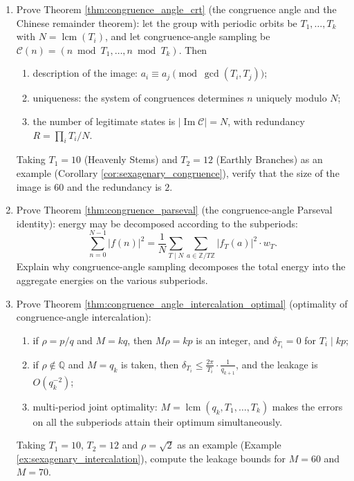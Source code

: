 \begin{enumerate}[leftmargin=3em, label=\textbf{Exercise \arabic*}]
    \item Prove Theorem \ref{thm:congruence_angle_crt} (the congruence angle and the Chinese remainder theorem):
    let the group with periodic orbits be $T_1,\dots,T_k$ with $N=\operatorname{lcm}(T_i)$, and let
    congruence-angle sampling be $\mathcal{C}(n)=(n\bmod T_1,\dots,n\bmod T_k)$. Then
    \begin{enumerate}[label=(\roman*)]
        \item description of the image: $a_i\equiv a_j\pmod{\gcd(T_i,T_j)}$;
        \item uniqueness: the system of congruences determines $n$ uniquely modulo $N$;
        \item the number of legitimate states is $|\operatorname{Im}\mathcal{C}|=N$, with redundancy
              $R=\prod_iT_i/N$.
    \end{enumerate}
    Taking $T_1=10$ (Heavenly Stems) and $T_2=12$ (Earthly Branches) as an example (Corollary \ref{cor:sexagenary_congruence}),
    verify that the size of the image is $60$ and the redundancy is $2$.

    \item Prove Theorem \ref{thm:congruence_parseval} (the congruence-angle Parseval identity):
    energy may be decomposed according to the subperiods:
    \[
    \sum_{n=0}^{N-1}|f(n)|^2
    =\frac{1}{N}\sum_{T\mid N}\sum_{a\in\mathbb{Z}/T\mathbb{Z}}
    |f_T(a)|^2\cdot w_T.
    \]
    Explain why congruence-angle sampling decomposes the total energy into the aggregate energies on the various subperiods.

    \item Prove Theorem \ref{thm:congruence_angle_intercalation_optimal} (optimality of congruence-angle intercalation):
    \begin{enumerate}[label=(\roman*)]
        \item if $\rho=p/q$ and $M=kq$, then $M\rho=kp$ is an integer,
              and $\delta_{T_i}=0$ for $T_i\mid kp$;
        \item if $\rho\notin\mathbb{Q}$ and $M=q_k$ is taken, then
              $\delta_{T_i}\le\frac{2\pi}{T_i}\cdot\frac{1}{q_{k+1}}$,
              and the leakage is $O(q_k^{-2})$;
        \item multi-period joint optimality: $M=\operatorname{lcm}(q_k,T_1,\dots,T_k)$
              makes the errors on all the subperiods attain their optimum simultaneously.
    \end{enumerate}
    Taking $T_1=10$, $T_2=12$ and $\rho=\sqrt{2}$ as an example (Example \ref{ex:sexagenary_intercalation}),
    compute the leakage bounds for $M=60$ and $M=70$.


\end{enumerate}
